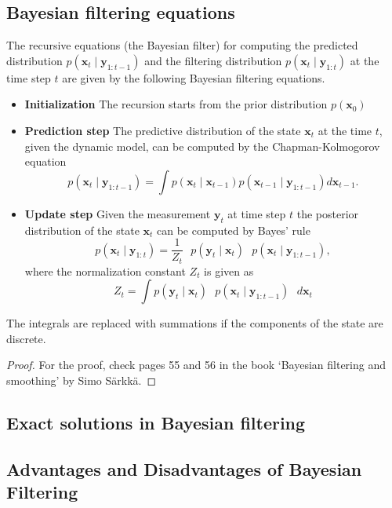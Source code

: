 \subsection{Bayesian filtering equations}
\begin{theorem}
The recursive equations (the Bayesian filter) for computing the predicted distribution $p(\mathbf{x}_t \mid \mathbf{y}_{1:t-1})$ and the filtering distribution $p(\mathbf{x}_t \mid \mathbf{y}_{1:t})$ at the time step $t$ are given by the following Bayesian filtering equations.
\begin{itemize}
    \item \textbf{Initialization} The recursion starts from the prior distribution $p(\mathbf{x}_0)$
    \item \textbf{Prediction step} The predictive distribution of the state $\mathbf{x}_t$ at the time $t$, given the dynamic model, can be computed by the Chapman-Kolmogorov equation
    \[p(\mathbf{x}_t \mid \mathbf{y}_{1:t-1}) = \int p(\mathbf{x}_t \mid \mathbf{x}_{t-1})p(\mathbf{x}_{t-1} \mid \mathbf{y}_{1:t-1})d\mathbf{x}_{t-1}.\]
    \item \textbf{Update step} Given the measurement $\mathbf{y}_t$ at time step $t$ the posterior distribution of the state $\mathbf{x}_t$ can be computed by Bayes' rule
    \[p(\mathbf{x}_t\mid \mathbf{y}_{1:t}) = \frac{1}{Z_t}\textbf{ }p(\mathbf{y}_t \mid \mathbf{x}_t)\textbf{ }p(\mathbf{x}_t\mid \mathbf{y}_{1:t-1}),\]
    where the normalization constant $Z_t$ is given as 
    \[Z_t = \int p(\mathbf{y}_t \mid \mathbf{x}_t) \textbf{ }p(\mathbf{x}_t\mid \mathbf{y}_{1:t-1}) \textbf{ }d\mathbf{x}_t\]
\end{itemize}
The integrals are replaced with summations if the components of the state are discrete. 
\end{theorem}

\begin{proof}
For the proof, check pages 55 and 56 in the book `Bayesian filtering and smoothing' by Simo Särkkä. 
\end{proof}

\begin{example}
    
\end{example}


\subsection{Exact solutions in Bayesian filtering}


\subsection{Advantages and Disadvantages of Bayesian Filtering}

